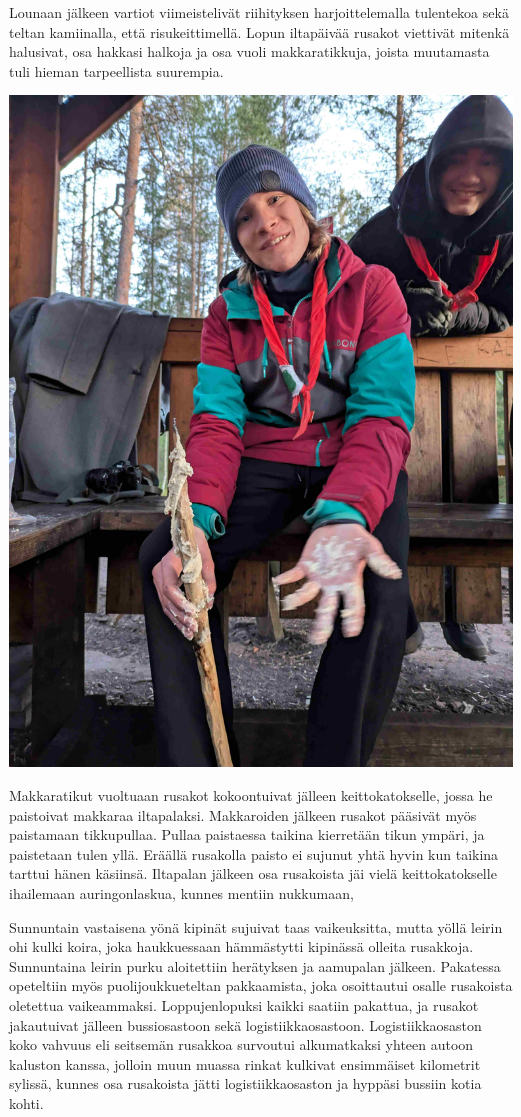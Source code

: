 \begin{multicols}{2}
Lounaan jälkeen vartiot viimeistelivät riihityksen harjoittelemalla tulentekoa
sekä teltan kamiinalla, että risukeittimellä. Lopun iltapäivää rusakot
viettivät mitenkä halusivat, osa hakkasi halkoja ja osa vuoli makkaratikkuja,
joista muutamasta tuli hieman tarpeellista suurempia. 

\smallskip
\noindent\includegraphics[width=1.0\linewidth]{assets/telttaretki3}

Makkaratikut vuoltuaan rusakot kokoontuivat jälleen keittokatokselle, jossa he
paistoivat makkaraa iltapalaksi. Makkaroiden jälkeen rusakot pääsivät myös
paistamaan tikkupullaa. Pullaa paistaessa taikina kierretään tikun ympäri, ja
paistetaan tulen yllä. Eräällä rusakolla paisto ei sujunut yhtä hyvin kun
taikina tarttui hänen käsiinsä. Iltapalan jälkeen osa rusakoista jäi vielä
keittokatokselle ihailemaan auringonlaskua, kunnes mentiin nukkumaan,

Sunnuntain vastaisena yönä kipinät sujuivat taas vaikeuksitta, mutta yöllä
leirin ohi kulki koira, joka haukkuessaan hämmästytti kipinässä olleita
rusakkoja. Sunnuntaina leirin purku aloitettiin herätyksen ja aamupalan
jälkeen. Pakatessa opeteltiin myös puolijoukkueteltan pakkaamista, joka
osoittautui osalle rusakoista oletettua vaikeammaksi. Loppujenlopuksi kaikki
saatiin pakattua, ja rusakot jakautuivat jälleen bussiosastoon sekä
logistiikkaosastoon. Logistiikkaosaston koko vahvuus eli seitsemän rusakkoa
survoutui alkumatkaksi yhteen autoon kaluston kanssa, jolloin muun muassa
rinkat kulkivat ensimmäiset kilometrit sylissä, kunnes osa rusakoista jätti
logistiikkaosaston ja hyppäsi bussiin kotia kohti.


\end{multicols}
